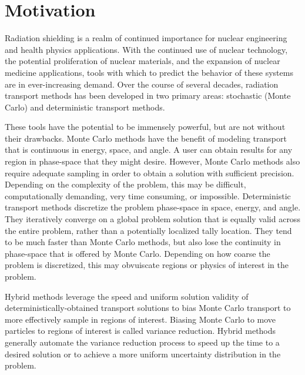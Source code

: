 \section{Motivation}
\label{sec:motivation}

Radiation shielding is a realm of continued importance for nuclear engineering
and health physics applications. With the continued use of nuclear technology,
the potential proliferation of nuclear materials, and the expansion of
nuclear medicine applications, tools with which to predict the behavior
of these systems are
in ever-increasing demand. Over the course of several decades, radiation
transport methods has been developed in two primary areas: stochastic (Monte
Carlo) and
deterministic transport methods.

These tools have the potential to be immensely
powerful, but are not without their drawbacks. Monte Carlo methods have the
benefit of modeling transport that is continuous in energy, space, and angle.
A user can obtain results for any region in phase-space that they might desire.
However, Monte Carlo methods also require adequate sampling in order to obtain a
solution with sufficient precision. Depending on the complexity of the problem,
this may be difficult, computationally demanding, very time consuming,
or impossible. Deterministic
transport methods discretize the problem phase-space in space, energy, and
angle. They iteratively converge on a global problem solution that is equally
valid across the entire problem, rather than a potentially localized tally
location. They tend to be much faster than Monte Carlo methods, but also lose
the continuity in phase-space that is offered by Monte Carlo. Depending on how
coarse the problem is discretized, this may obvuiscate regions or physics of
interest in the problem.

Hybrid methods leverage the speed and uniform solution validity of
deterministically-obtained transport solutions to bias Monte Carlo transport to
more effectively sample in regions of interest. Biasing Monte Carlo to move
particles to regions of interest is called variance reduction. Hybrid methods
generally automate the variance reduction process to speed up the time to a
desired solution or to achieve a more uniform uncertainty distribution in the
problem.
